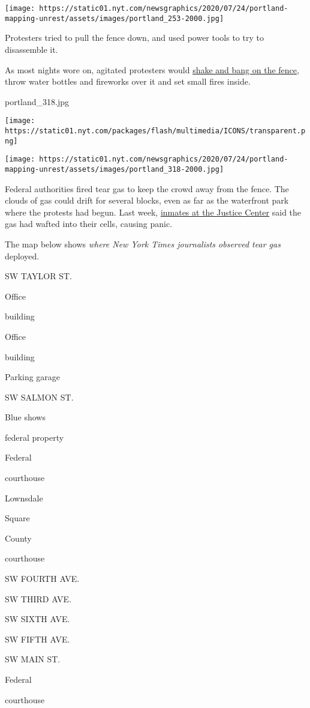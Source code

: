 \texttt{[image: https://static01.nyt.com/newsgraphics/2020/07/24/portland-mapping-unrest/assets/images/portland\_253-2000.jpg]}

Protesters tried to pull the fence down, and used power tools to try to
disassemble it.

As most nights wore on, agitated protesters would
\href{https://www.youtube.com/watch?v=XqebTNY6cI0}{shake and bang on the
fence}, throw water bottles and fireworks over it and set small fires
inside.

portland\_318.jpg

\texttt{[image: https://static01.nyt.com/packages/flash/multimedia/ICONS/transparent.png]}

\texttt{[image: https://static01.nyt.com/newsgraphics/2020/07/24/portland-mapping-unrest/assets/images/portland\_318-2000.jpg]}

Federal authorities fired tear gas to keep the crowd away from the
fence. The clouds of gas could drift for several blocks, even as far as
the waterfront park where the protests had begun. Last week,
\href{https://www.oregonlive.com/crime/2020/07/downtown-jail-inmates-hitting-panic-buttons-due-to-tear-gas-wafting-into-cells-lawyers-say.html}{inmates
at the Justice Center} said the gas had wafted into their cells, causing
panic.

The map below shows \emph{where New York Times journalists observed tear
gas} deployed.

SW TAYLOR ST.

Office

building

Office

building

Parking garage

SW SALMON ST.

Blue shows

federal property

Federal

courthouse

Lownsdale

Square

County

courthouse

SW FOURTH AVE.

SW THIRD AVE.

SW SIXTH AVE.

SW FIFTH AVE.

SW MAIN ST.

Federal

courthouse

